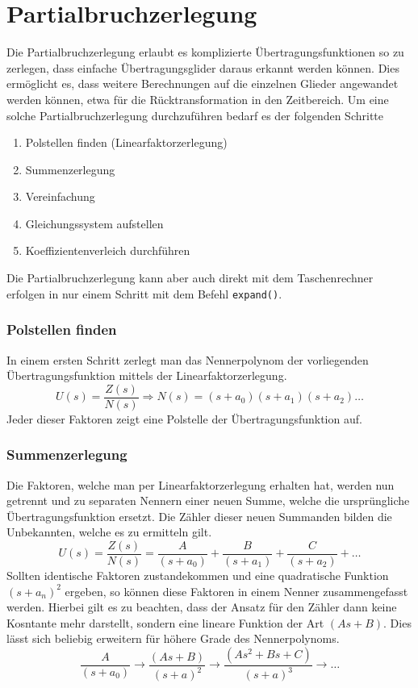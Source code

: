 \section{Partialbruchzerlegung}
Die Partialbruchzerlegung erlaubt es komplizierte Übertragungsfunktionen
so zu zerlegen, dass einfache Übertragungsglider daraus erkannt werden 
können. Dies ermöglicht es, dass weitere Berechnungen auf die einzelnen
Glieder angewandet werden können, etwa für die Rücktransformation in 
den Zeitbereich. Um eine solche Partialbruchzerlegung durchzuführen 
bedarf es der folgenden Schritte
%
\begin{enumerate}
    \item Polstellen finden (Linearfaktorzerlegung)
    \item Summenzerlegung
    \item Vereinfachung
    \item Gleichungssystem aufstellen
    \item Koeffizientenverleich durchführen
\end{enumerate}
%
Die Partialbruchzerlegung kann aber auch direkt mit dem Taschenrechner
erfolgen in nur einem Schritt mit dem Befehl \verb?expand()?.

\subsubsection{Polstellen finden}
In einem ersten Schritt zerlegt man das Nennerpolynom der vorliegenden 
Übertragungsfunktion mittels der Linearfaktorzerlegung.
\[  
    U(s) 
        = \frac{Z(s)}{N(s)} 
        \Rightarrow N(s) 
        = (s+a_0)(s+a_1)(s+a_2) \dots	
\]
Jeder dieser Faktoren zeigt eine Polstelle der Übertragungsfunktion auf.

\subsubsection{Summenzerlegung}
Die Faktoren, welche man per Linearfaktorzerlegung erhalten hat, werden
nun getrennt und zu separaten Nennern einer neuen Summe, welche die
ursprüngliche Übertragungsfunktion ersetzt. Die Zähler dieser neuen
Summanden bilden die Unbekannten, welche es zu ermitteln gilt.
\[  
    U(s) 
        = \frac{Z(s)}{N(s)} 
        = \frac{A}{(s+a_0)} + \frac{B}{(s+a_1)} + \frac{C}{(s+a_2)} + \dots 
\]
Sollten identische Faktoren zustandekommen und eine quadratische 
Funktion $(s+a_n)^2$ ergeben, so können diese Faktoren in einem Nenner
zusammengefasst werden. Hierbei gilt es zu beachten, dass
der Ansatz für den Zähler dann keine Kosntante mehr darstellt, sondern 
eine lineare Funktion der Art $(As + B)$. Dies lässt sich beliebig erweitern
für höhere Grade des Nennerpolynoms.
\[  
    \frac{A}{(s+a_0)} 
    \rightarrow \frac{(As + B)}{(s+a)^2}
    \rightarrow \frac{(As^2 + Bs + C)}{(s+a)^3}
    \rightarrow \dots
\]


